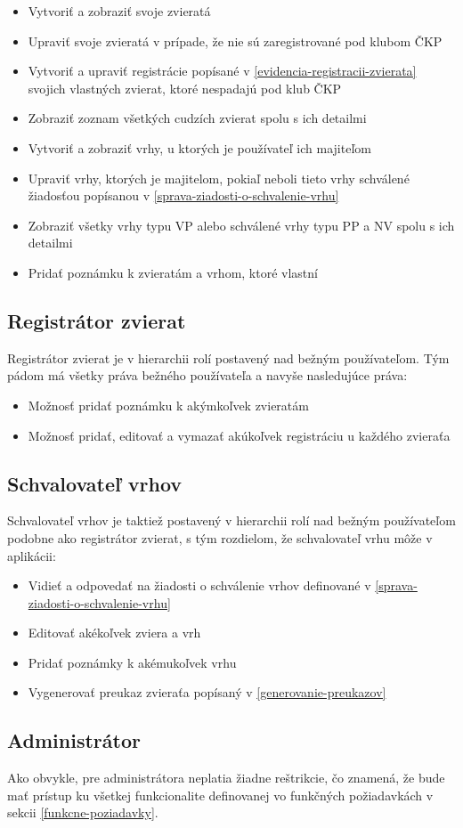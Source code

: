 \begin{itemize}
	\item Vytvoriť a zobraziť svoje zvieratá
	\item Upraviť svoje zvieratá v prípade, že nie sú zaregistrované pod klubom ČKP
	\item Vytvoriť a upraviť registrácie popísané v \ref{evidencia-registracii-zvierata} svojich vlastných zvierat, ktoré nespadajú pod klub ČKP
	\item Zobraziť zoznam všetkých cudzích zvierat spolu s ich detailmi
	\item Vytvoriť a zobraziť vrhy, u ktorých je používateľ ich majiteľom
	\item Upraviť vrhy, ktorých je majitelom, pokiaľ neboli tieto vrhy schválené žiadosťou popísanou v \ref{sprava-ziadosti-o-schvalenie-vrhu}
	\item Zobraziť všetky vrhy typu VP alebo schválené vrhy typu PP a NV spolu s ich detailmi
	\item Pridať poznámku k zvieratám a vrhom, ktoré vlastní
\end{itemize}

\subsection{Registrátor zvierat}
Registrátor zvierat je v hierarchii rolí postavený nad bežným používateľom. Tým pádom má všetky práva bežného používateľa a navyše nasledujúce práva:

\begin{itemize}
	\item Možnosť pridať poznámku k akýmkoľvek zvieratám
	\item Možnosť pridať, editovať a vymazať akúkoľvek registráciu u každého zvieraťa
\end{itemize} 

\subsection{Schvalovateľ vrhov}
Schvalovateľ vrhov je taktiež postavený v hierarchii rolí nad bežným používateľom podobne ako registrátor zvierat, s tým rozdielom, že schvalovateľ vrhu môže v aplikácii:

\begin{itemize}
	\item Vidieť a odpovedať na žiadosti o schválenie vrhov definované v \ref{sprava-ziadosti-o-schvalenie-vrhu}
	\item Editovať akékoľvek zviera a vrh
	\item Pridať poznámky k akémukoľvek vrhu
	\item Vygenerovať preukaz zvieraťa popísaný v \ref{generovanie-preukazov}
\end{itemize}

\subsection{Administrátor}
Ako obvykle, pre administrátora neplatia žiadne reštrikcie, čo znamená, že bude mať prístup ku všetkej funkcionalite definovanej vo funkčných požiadavkách v sekcii \ref{funkcne-poziadavky}.